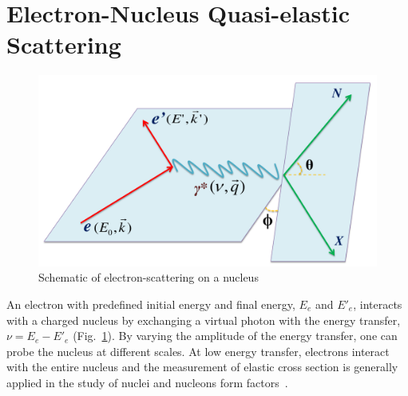 

\section{Electron-Nucleus Quasi-elastic Scattering}
\begin{figure}[!ht]
  \begin{center}         
    \includegraphics[type=pdf,ext=.pdf,read=.pdf,width=0.60\linewidth]{./figures/physics/e_scatt}
    \caption[Schematic of electron-scattering on a nucleus]{\footnotesize{Schematic of electron-scattering on a nucleus}}
    \label{e_scatt}
  \end{center}
\end{figure}
An electron with predefined initial energy and final energy, $E_{e}$ and $E'_{e}$, interacts with a charged nucleus by exchanging a virtual photon with the energy transfer, $\nu = E_{e}-E'_{e}$ (Fig.~\ref{e_scatt}). By varying the amplitude of the energy transfer, one can probe the nucleus at different scales. At low energy transfer, electrons interact with the entire nucleus and the measurement of elastic cross section is generally applied in the study of nuclei and nucleons form factors~\cite{bfrois}. 

